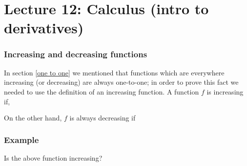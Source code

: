 \chapter{Lecture 12: Calculus (intro to derivatives)}

\subsection{Increasing and decreasing functions} \label{increasing decreasing 2}
In section \ref{one to one} we mentioned that functions which are everywhere increasing (or decreasing) are always one-to-one; in order to prove this fact we needed to use the definition of an increasing function. A function $f$ is increasing if, 

  	\bigskip
	
	\hfil{}
	\bigskip
	\bigskip
	
\noindent On the other hand, $f$ is always decreasing if

  	\bigskip
	
	\hfil{}
	\bigskip
	\bigskip
	
\subsection{Example} \label{ex12.0}
\begin{center}
\end{center}
Is the above function increasing? \\

